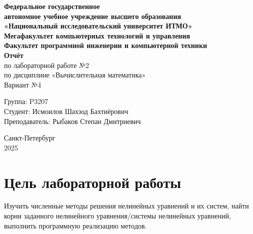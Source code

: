 \documentclass[a4paper,12pt]{article}
\begin{document}
\begin{titlepage}
  \begin{center}
    \textbf{Федеральное государственное}\\
    \textbf{автономное учебное учреждение высшего образования}\\[0.5em]
    \textbf{«Национальный исследовательский университет ИТМО»}\\[2em]
    \textbf{Мегафакультет компьютерных технологий и управления}\\
    \textbf{Факультет программной инженерии и компьютерной техники}\\[4em]
    \LARGE\textbf{Отчёт}\\[0.5em]
    \large по лабораторной работе №2\\
    по дисциплине «Вычислительная математика»\\[0.5em]
    \normalsize Вариант №4
  \end{center}

  \vfill
  \begin{flushright}
    Группа: P3207\\
    Студент: Исмоилов Шахзод Бахтиёрович\\
    Преподаватель: Рыбаков Степан Дмитриевич\\
  \end{flushright}

  \vspace{2em}
  \begin{center}
    Санкт-Петербург\\
    2025
  \end{center}
\end{titlepage}

\tableofcontents
\newpage

\section{Цель лабораторной работы}
Изучить численные методы решения нелинейных уравнений и их систем, найти корни заданного нелинейного уравнения/системы нелинейных уравнений, выполнить программную реализацию методов.

\end{document}
